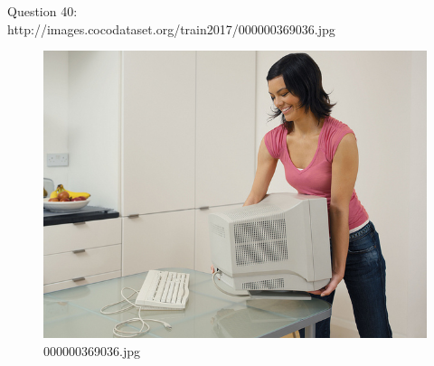    Question 40:\\http://images.cocodataset.org/train2017/000000369036.jpg
    \begin{figure}[h]
        \centering
        \includegraphics[width=0.8\linewidth]{../image set/easy/000000369036.jpg}
        \caption{000000369036.jpg}
    \end{figure}
